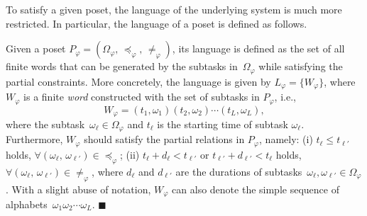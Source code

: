 To satisfy a given poset, the language of the underlying system is
much more restricted.
In particular, the language of a poset is defined as follows.

\begin{definition}\label{def:language-poset}
Given a poset $P_\varphi=(\Omega_{\varphi}, \, \preceq_{\varphi}, \, \neq_{\varphi})$,
its language is defined as the set of all finite words
that can be generated by the subtasks in~$\Omega_{\varphi}$
while satisfying the partial constraints.
More concretely, the language is given by
$L_\varphi=\{W_{\varphi}\}$, where $W_{\varphi}$ is a finite
\emph{word} constructed with the set of subtasks in $P_\varphi$, i.e.,
\begin{equation}\label{eq:poset-language}
W_{\varphi}=(t_1,\omega_1) (t_2,\omega_2)\cdots (t_L,\omega_L),
\end{equation}
where the subtask~$\omega_\ell \in \Omega_\varphi$ and
$t_\ell$ is the starting time of subtask $\omega_\ell$.
Furthermore, $W_{\varphi}$ should satisfy the partial relations in $P_\varphi$, namely:
(i) $t_\ell \leq t_{\ell'}$ holds,
$\forall (\omega_\ell,\,\omega_{\ell'})\in \preceq_{\varphi}$;
(ii) $t_\ell + d_\ell <  t_{\ell'}$ or $t_{\ell'} + d_{\ell'} <  t_{\ell}$ holds,
$\forall (\omega_\ell,\,\omega_{\ell'})\in \neq_{\varphi}$,
where $d_\ell$ and $d_{\ell'}$ are the durations of
subtasks~$\omega_\ell, \omega_{\ell'} \in \Omega_{\varphi}$.
With a slight abuse of notation, $W_\varphi$ can also denote the
simple sequence of alphabets~$\omega_1\omega_2\cdots \omega_L$.
\hfill $\blacksquare$
\end{definition}


